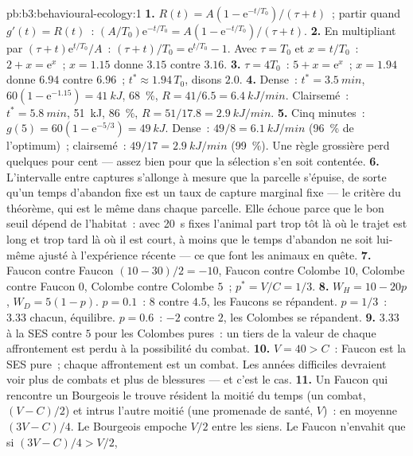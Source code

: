 \begin{solution}{pb:b3:behavioural-ecology:1}
\textbf{1.} $R(t) = A(1 - \mathrm{e}^{-t/T_{0}})/(\tau + t)$~; partir quand
$g'(t) = R(t)$~: $(A/T_{0})\mathrm{e}^{-t/T_{0}} = A(1 - \mathrm{e}^{-t/T_{0}})/
(\tau + t)$.
\textbf{2.} En multipliant par $(\tau + t)\mathrm{e}^{t/T_{0}}/A$~: $(\tau + t)/T_{0}
= \mathrm{e}^{t/T_{0}} - 1$. Avec $\tau = T_{0}$ et $x = t/T_{0}$~: $2 + x =
\mathrm{e}^{x}$~; $x = 1.15$ donne $3.15$ contre $3.16$.
\textbf{3.} $\tau = 4T_{0}$~: $5 + x = \mathrm{e}^{x}$~; $x = 1.94$ donne
$6.94$ contre $6.96$~; $t^{*} \approx 1.94\,T_{0}$, disons $2.0$.
\textbf{4.} Dense~: $t^{*} = \qty{3.5}{min}$, $60(1 - \mathrm{e}^{-1.15}) =
\qty{41}{kJ}$, \qty{68}{\%}, $R = 41/6.5 = \qty{6.4}{kJ/min}$.
Clairsemé~: $t^{*} = \qty{5.8}{min}$, \qty{51}{kJ}, \qty{86}{\%}, $R = 51/17.8 =
\qty{2.9}{kJ/min}$.
\textbf{5.} Cinq minutes~: $g(5) = 60(1 - \mathrm{e}^{-5/3}) = \qty{49}{kJ}$.
Dense~: $49/8 = \qty{6.1}{kJ/min}$ (\qty{96}{\%} de l'optimum)~;
clairsemé~: $49/17 = \qty{2.9}{kJ/min}$ (\qty{99}{\%}). Une règle
grossière perd quelques pour cent --- assez bien pour que la sélection
s'en soit contentée.
\textbf{6.} L'intervalle entre captures s'allonge à mesure que la
parcelle s'épuise, de sorte qu'un temps d'abandon fixe est un taux de
capture marginal fixe --- le critère du théorème, qui est le même dans
chaque parcelle. Elle échoue parce que le bon seuil dépend de
l'habitat~: avec \qty{20}{s} fixes l'animal part trop tôt là où le trajet
est long et trop tard là où il est court, à moins que le temps d'abandon
ne soit lui-même ajusté à l'expérience récente --- ce que font les
animaux en quête.
\textbf{7.} Faucon contre Faucon $(10 - 30)/2 = -10$, Faucon contre
Colombe $10$, Colombe contre Faucon $0$, Colombe contre Colombe $5$~;
$p^{*} = V/C = 1/3$.
\textbf{8.} $W_{H} = 10 - 20p$, $W_{D} = 5(1 - p)$. $p = 0.1$~: $8$ contre
$4.5$, les Faucons se répandent. $p = 1/3$~: $3.33$ chacun, équilibre.
$p = 0.6$~: $-2$ contre $2$, les Colombes se répandent.
\textbf{9.} $3.33$ à la SES contre $5$ pour les Colombes pures~: un tiers
de la valeur de chaque affrontement est perdu à la possibilité du combat.
\textbf{10.} $V = 40 > C$~: Faucon est la SES pure~; chaque affrontement
est un combat. Les années difficiles devraient voir plus de combats et
plus de blessures --- et c'est le cas.
\textbf{11.} Un Faucon qui rencontre un Bourgeois le trouve résident la
moitié du temps (un combat, $(V - C)/2$) et intrus l'autre moitié (une
promenade de santé, $V$)~: en moyenne $(3V - C)/4$. Le Bourgeois empoche
$V/2$ entre les siens. Le Faucon n'envahit que si $(3V - C)/4 > V/2$,

\end{solution}

